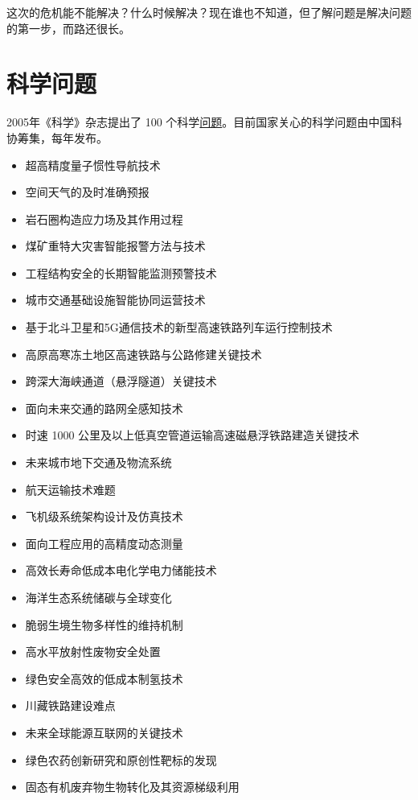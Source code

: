 \documentclass[]{tufte-book}
\providecommand{\tightlist}{%
  \setlength{\itemsep}{0pt}\setlength{\parskip}{0pt}}
\begin{document}
这次的危机能不能解决？什么时候解决？现在谁也不知道，但了解问题是解决问题的第一步，而路还很长。

\hypertarget{ux79d1ux5b66ux95eeux9898}{%
\section{科学问题}\label{ux79d1ux5b66ux95eeux9898}}

2005年《科学》杂志提出了 100 个科学\href{https://science.sciencemag.org/content/309/5731/78.2}{问题}。目前国家关心的科学问题由中国科协筹集，每年发布。

\begin{itemize}
\tightlist
\item
  超高精度量子惯性导航技术
\item
  空间天气的及时准确预报
\item
  岩石圈构造应力场及其作用过程
\item
  煤矿重特大灾害智能报警方法与技术
\item
  工程结构安全的长期智能监测预警技术
\item
  城市交通基础设施智能协同运营技术
\item
  基于北斗卫星和5G通信技术的新型高速铁路列车运行控制技术
\item
  高原高寒冻土地区高速铁路与公路修建关键技术
\item
  跨深大海峡通道（悬浮隧道）关键技术
\item
  面向未来交通的路网全感知技术
\item
  时速 1000 公里及以上低真空管道运输高速磁悬浮铁路建造关键技术
\item
  未来城市地下交通及物流系统
\item
  航天运输技术难题
\item
  飞机级系统架构设计及仿真技术
\item
  面向工程应用的高精度动态测量
\item
  高效长寿命低成本电化学电力储能技术
\item
  海洋生态系统储碳与全球变化
\item
  脆弱生境生物多样性的维持机制
\item
  高水平放射性废物安全处置
\item
  绿色安全高效的低成本制氢技术
\item
  川藏铁路建设难点
\item
  未来全球能源互联网的关键技术
\item
  绿色农药创新研究和原创性靶标的发现
\item
  固态有机废弃物生物转化及其资源梯级利用

\end{itemize}
\end{document}
